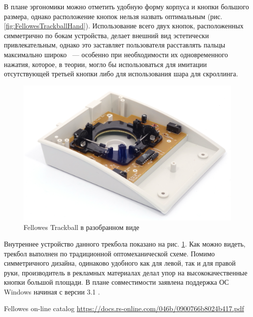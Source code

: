 \documentclass[11pt, a4paper]{article}
\begin{document}
В плане эргономики можно отметить удобную форму корпуса и кнопки большого размера, однако расположение кнопок нельзя назвать оптимальным (рис. \ref{fig:FellowesTrackballHand}). Использование всего двух кнопок, расположенных симметрично по бокам устройства, делает внешний вид эстетически привлекательным, однако это заставляет пользователя расставлять пальцы максимально широко ~--- особенно при необходимости их одновременного нажатия, которое, в теории, могло бы использоваться для имитации отсутствующей третьей кнопки либо для использования шара для скроллинга.

\begin{figure}[h]
    \centering
    \includegraphics[scale=0.7]{1997_fellowes_trackball/inside_60.jpg}
    \caption{Fellowes Trackball в разобранном виде}
    \label{fig:FellowesTrackballInside}
\end{figure}

Внутреннее устройство данного трекбола показано на рис. \ref{fig:FellowesTrackballInside}. Как можно видеть,  трекбол выполнен по традиционной оптомеханической схеме. Помимо симметричного дизайна, одинаково удобного как для левой, так и для правой руки, производитель в рекламных материалах делал упор на высококачественные кнопки большой площади. В плане совместимости заявлена поддержка ОС Windows начиная с версии 3.1 \cite{advertising}.

\begin{thebibliography}{9}
 Fellowes on-line catalog \url{https://docs.rs-online.com/046b/0900766b8024b417.pdf}
\end{thebibliography}
\end{document}
